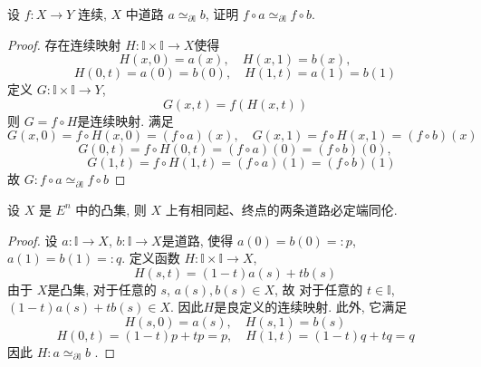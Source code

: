 \documentclass[../main.tex]{subfiles}
\begin{document}
\begin{exercise}{}{}
设 $f: X \to Y$ 连续, $X$ 中道路 $a \simeq_{ \partial \mathbb{I}} b$, 证明 $f \circ a \simeq_{ \partial \mathbb{I}} f \circ b$.
\end{exercise}
\begin{proof}
    存在连续映射 \(  H: \mathbb{I}\times \mathbb{I}\to X  \)使得 \[
    H\left( x,0 \right)= a\left( x \right),\quad H\left( x,1 \right)= b\left( x \right),
    \] \[
    H\left( 0,t \right)= a\left( 0 \right)= b\left( 0 \right),\quad H\left( 1,t \right)= a\left( 1 \right)= b\left( 1 \right)          
    \]定义 \(  G: \mathbb{I}\times \mathbb{I}\to Y  \), \[
    G\left( x,t \right)= f\left( H\left( x,t \right)  \right)  
    \] 则 \(  G= f\circ H  \)是连续映射. 满足 \[
    G\left( x,0 \right)=f\circ H\left( x,0  \right)= \left( f\circ a \right)\left( x \right),\quad G\left( x,1 \right)= f\circ H\left( x,1  \right)= \left( f\circ b \right)\left( x \right)        
    \]  \[
    G\left( 0,t \right)=f\circ H\left( 0,t \right)= \left( f\circ a \right)\left( 0 \right)= \left( f\circ b \right)\left( 0 \right)  ,   
    \] \[
    \quad G\left( 1,t \right)= f\circ H\left( 1,t \right)= \left( f\circ a \right)\left( 1 \right)   = \left( f\circ b \right)\left( 1 \right)   
    \]故 \(  G: f\circ a \simeq_{ \partial \mathbb{I}} f\circ b \) 
\end{proof}
\begin{exercise}{}{}
    
设 $X$ 是 $E^n$ 中的凸集, 则 $X$ 上有相同起、终点的两条道路必定端同伦.
\end{exercise}
\begin{proof}
    设 \(  a: \mathbb{I}\to X  \), \(  b:\mathbb{I}\to X  \)是道路, 使得 \(  a\left( 0 \right)= b\left( 0 \right)= : p    \), \(  a\left( 1 \right)= b\left( 1 \right)= : q    \).     定义函数 \(  H: \mathbb{I}\times \mathbb{I}\to X  \), \[
    H\left(s,t \right)= \left( 1-t \right)a\left( s \right)+ tb\left( s \right)     
    \] 由于 \(  X  \)是凸集, 对于任意的 \(  s   \), \(  a\left( s \right), b\left( s \right) \in X    \), 故 对于任意的 \(  t \in \mathbb{I}  \),  \(  \left( 1-t \right)a\left( s \right)+ tb\left( s \right) \in X     \). 因此\(  H  \)是良定义的连续映射. 此外, 它满足 \[
    H\left( s,0 \right)= a\left( s \right),\quad H\left( s,1 \right)= b\left( s \right)    
    \]       \[
    H\left( 0,t \right)= \left( 1-t \right)p+ tp= p,\quad H\left( 1,t \right)= \left( 1-t \right)q+ tq= q    
    \]因此 \(  H: a\simeq _{ \partial \mathbb{I}} b  \) .
\end{proof}
\end{document}
